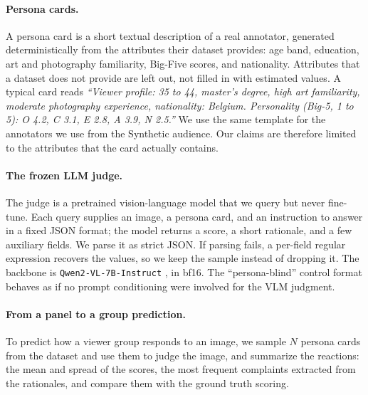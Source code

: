 \documentclass[10pt,twocolumn,letterpaper]{article}
\begin{document}
\paragraph{Persona cards.} A persona card is a short textual description of a real annotator, generated deterministically from the attributes their dataset provides: age band, education, art and photography familiarity, Big-Five scores, and nationality. Attributes that a dataset does not provide are left out, not filled in with estimated values. A typical card reads \emph{``Viewer profile: 35 to 44, master's degree, high art familiarity, moderate photography experience, nationality: Belgium. Personality (Big-5, 1 to 5): O 4.2, C 3.1, E 2.8, A 3.9, N 2.5.''} We use the same template for the annotators we use from the Synthetic audience. Our claims are therefore limited to the attributes that the card actually contains.
\paragraph{The frozen LLM judge.} The judge is a pretrained vision-language model that we query but never fine-tune. Each query supplies an image, a persona card, and an instruction to answer in a fixed JSON format; the model returns a score, a short rationale, and a few auxiliary fields. We parse it as strict JSON. If parsing fails, a per-field regular expression recovers the values, so we keep the sample instead of dropping it.  The backbone is \texttt{Qwen2-VL-7B-Instruct} \citep{wang2024qwen2vl}, in bf16. The “persona-blind” control format behaves as if no prompt conditioning were involved for the VLM judgment.
\paragraph{From a panel to a group prediction.} To predict how a viewer group responds to an image, we sample $N$ persona cards from the dataset and use them to judge the image, and summarize the reactions: the mean and spread of the scores, the most frequent complaints extracted from the rationales, and compare them with the ground truth scoring.
\end{document}
